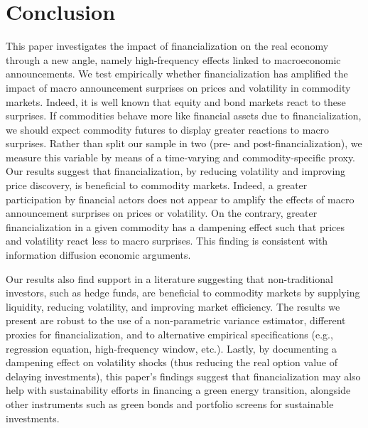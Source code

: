 \section{Conclusion} \label{sec:conclusion}




This paper investigates the impact of financialization on the real economy through a new angle, namely high-frequency effects linked to macroeconomic announcements. We test empirically whether financialization has amplified the impact of macro announcement surprises on prices and volatility in commodity markets. Indeed, it is well known that equity and bond markets react to these surprises. If commodities behave more like financial assets due to financialization, we should expect commodity futures to display greater reactions to macro surprises. Rather than split our sample in two (pre- and post-financialization), we measure this variable by means of a time-varying and commodity-specific proxy. Our results suggest that financialization, by reducing volatility and improving price discovery, is beneficial to commodity markets. Indeed, a greater participation by financial actors does not appear to amplify the effects of macro announcement surprises on prices or volatility. On the contrary,  greater financialization in a given commodity has a dampening effect such that prices and volatility react less to macro surprises. This finding is consistent with information diffusion economic arguments.


Our results also find support in a literature suggesting that non-traditional investors, such as hedge funds, are beneficial to commodity markets by supplying liquidity, reducing volatility, and improving market efficiency. The results we present are robust to the use of a non-parametric variance estimator, different proxies for financialization, and to alternative empirical specifications (e.g., regression equation, high-frequency window, etc.). Lastly, by documenting a dampening effect on volatility shocks (thus reducing the real option value of delaying investments), this paper's findings suggest that financialization may also help with sustainability efforts in financing a green energy transition, alongside other instruments such as green bonds and portfolio screens for sustainable investments.